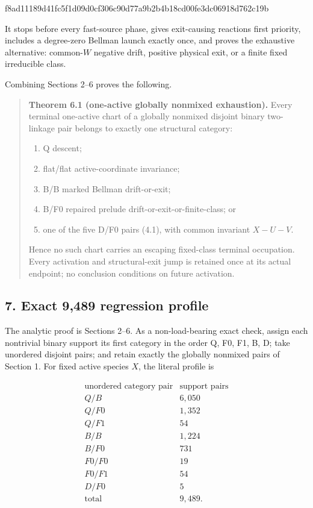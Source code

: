 \begingroup\scriptsize\ttfamily

f8ad11189d41fc5f1d09d0cf306c90d77a9b2b4b18cd00fe3dc06918d762c19b

\par\endgroup

It stops before every fast-source phase, gives exit-causing reactions
first priority, includes a degree-zero Bellman launch exactly once, and
proves the exhaustive alternative: common-\(W\) negative drift, positive
physical exit, or a finite fixed irreducible class.

Combining Sections 2--6 proves the following.

\begin{quote}
\textbf{Theorem 6.1 (one-active globally nonmixed exhaustion).} Every
terminal one-active chart of a globally nonmixed disjoint binary
two-linkage pair belongs to exactly one structural category:

\begin{enumerate}
\def\labelenumi{\arabic{enumi}.}
\tightlist
\item
  Q descent;
\item
  flat/flat active-coordinate invariance;
\item
  B/B marked Bellman drift-or-exit;
\item
  B/F0 repaired prelude drift-or-exit-or-finite-class; or
\item
  one of the five D/F0 pairs (4.1), with common invariant \(X-U-V\).
\end{enumerate}

Hence no such chart carries an escaping fixed-class terminal occupation.
Every activation and structural-exit jump is retained once at its actual
endpoint; no conclusion conditions on future activation.
\end{quote}

\subsection{7. Exact 9,489 regression
profile}

The analytic proof is Sections 2--6. As a non-load-bearing exact check,
assign each nontrivial binary support its first category in the order Q,
F0, F1, B, D; take unordered disjoint pairs; and retain exactly the
globally nonmixed pairs of Section 1. For fixed active species \(X\),
the literal profile is

\[
\begin{array}{c|r}
\text{unordered category pair}&\text{support pairs}\\ \hline
Q/B&6{,}050\\
Q/F0&1{,}352\\
Q/F1&54\\
B/B&1{,}224\\
B/F0&731\\
F0/F0&19\\
F0/F1&54\\
D/F0&5\\ \hline
\text{total}&9{,}489 .
\end{array}                                             \tag{7.1}
\]

